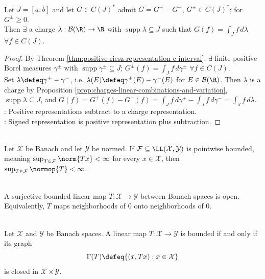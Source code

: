 \begin{corollary} \label{cor:riesz-representation-by-charges-conditional} \\
Let $J=[a,b]$ and let $G\in C(J)^*$ admit $G=G^+-G^-$, $G^\pm\in C(J)^*$; for $G^\pm\geq0$.\\
Then $\exists$ a charge $\lambda:\mathcal{B}(\R)\to\R$ with $\operatorname{supp}\lambda\subseteq J$ such that $G(f)=\int_J f\,d\lambda$ $\forall f\in C(J)$.
\begin{proof} By Theorem \ref{thm:positive-riesz-representation-c-interval}, $\exists$ finite positive Borel measures $\gamma^\pm$ with $\operatorname{supp}\gamma^\pm\subseteq J$; $G^\pm(f)=\int_J f\,d\gamma^\pm$ $\forall f\in C(J)$.\\
Set $\lambda\defeq\gamma^+-\gamma^-$, i.e. $\lambda(E)\defeq\gamma^+(E)-\gamma^-(E)$ for $E\in\mathcal{B}(\R)$. Then $\lambda$ is a charge by Proposition \ref{prop:charges-linear-combinations-and-variation}, $\operatorname{supp}\lambda\subseteq J$, and $G(f)=G^+(f)-G^-(f)=\int_J f\,d\gamma^+-\int_J f\,d\gamma^-=\int_J f\,d\lambda$.\\
: Positive representations subtract to a charge representation.\\
: Signed representation is positive representation plus subtraction.
\end{proof}
\end{corollary}

\begin{theorem} \label{thm:uniform-boundedness-principle} \\
Let $\mathcal{X}$ be Banach and let $\mathcal{Y}$ be normed. If $\mathcal{F}\subseteq\LL(\mathcal{X},\mathcal{Y})$ is pointwise bounded, meaning $\sup_{T\in\mathcal{F}}\norm{Tx}<\infty$ for every $x\in\mathcal{X}$, then $\sup_{T\in\mathcal{F}}\normop{T}<\infty$.
\end{theorem}

\begin{theorem} \label{thm:open-mapping-theorem} \\
A surjective bounded linear map $T:\mathcal{X}\to\mathcal{Y}$ between Banach spaces is open. Equivalently, $T$ maps neighborhoods of $0$ onto neighborhoods of $0$.
\end{theorem}

\begin{theorem} \label{thm:closed-graph-theorem} \\
Let $\mathcal{X}$ and $\mathcal{Y}$ be Banach spaces. A linear map $T:\mathcal{X}\to\mathcal{Y}$ is bounded if and only if its graph
\[
\Gamma(T)\defeq\{(x,Tx):x\in\mathcal{X}\}
\]
is closed in $\mathcal{X}\times\mathcal{Y}$.
\end{theorem}
